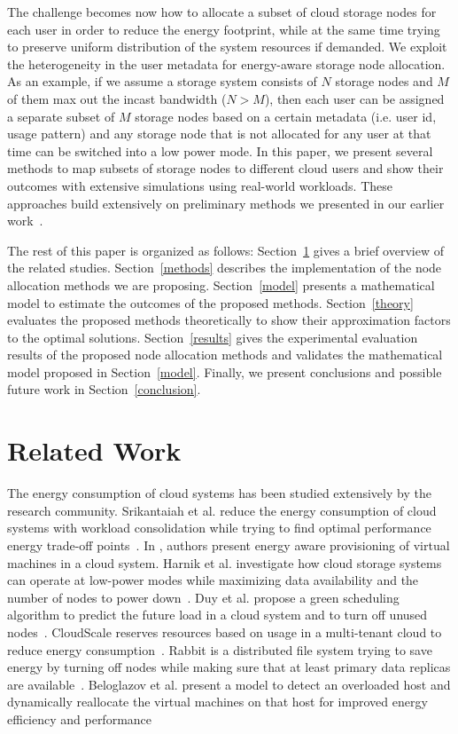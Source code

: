 \documentclass[preprint,12pt]{elsarticle}
\begin{document}
The challenge becomes now how to allocate a subset of cloud storage nodes for each user in order to reduce 
the energy footprint, while at the same time trying to preserve uniform distribution of the system resources if
demanded. We exploit the heterogeneity in the user metadata for energy-aware storage node allocation. As an
example, if we assume a storage system consists of $N$ storage nodes and $M$ of them
max out the incast bandwidth ($N > M$), then each user can be assigned a separate subset of $M$ storage
nodes based on a certain metadata (i.e. user id, usage pattern) and any storage node that is not allocated
for any user at that time can be switched into a low power mode. In this paper, we present several methods
to map subsets of storage nodes to different cloud users and show their outcomes with extensive simulations
using real-world workloads. These approaches build extensively on preliminary methods we presented in our
earlier work~\cite{6322247}.

The rest of this paper is organized as follows: 
Section~\ref{related} gives a brief overview of the related studies. 
Section~\ref{methods} describes the implementation of the node allocation methods we are proposing.
Section~\ref{model} presents a mathematical model to estimate the outcomes of the proposed methods.
Section~\ref{theory} evaluates the proposed methods theoretically to show their approximation factors
to the optimal solutions.
Section~\ref{results} gives the experimental evaluation results of the proposed node allocation methods
and validates the mathematical model proposed in Section~\ref{model}.
Finally, we present conclusions and possible future work in Section~\ref{conclusion}.

\section{Related Work}
\label{related}
The energy consumption of cloud systems has been studied extensively by the research
community. Srikantaiah et al. reduce the energy consumption of cloud systems
with workload consolidation while trying to find optimal performance
energy trade-off points~\cite{Srikantaiah:2008:EAC:1855610.1855620}.
In \cite{Kim:2009:PPC:1657120.1657121}, authors present energy aware provisioning
of virtual machines in a cloud system. Harnik et al. investigate how cloud storage
systems can operate at low-power modes while maximizing data availability and the
number of nodes to power down~\cite{Harnik:2009:LPM:1586640.1587438}. Duy et al.
propose a green scheduling algorithm to predict the future load in a cloud
system and to turn off unused nodes~\cite{5470908}. CloudScale reserves resources
based on usage in a multi-tenant cloud to reduce energy consumption~\cite{Shen:2011:CER:2038916.2038921}.
Rabbit is a distributed file system trying to save energy by turning off nodes while
making sure that at least primary data replicas are available~\cite{Amur:2010:RFP:1807128.1807164}.
Beloglazov et al. present a model to detect an overloaded host and dynamically reallocate
the virtual machines on that host for improved energy efficiency and
performance~\cite{Beloglazov:2013:MOH:2498743.2498939}
\end{document}

